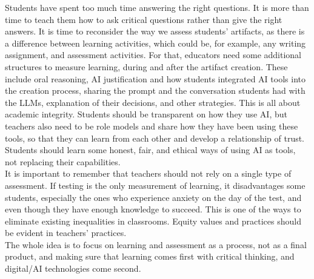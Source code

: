 \documentclass[english]{textolivre}
\begin{document}
{    Students have spent too much time answering the right questions. It is more than time to teach them how to ask critical questions rather than give the right answers. It is time to reconsider the way we assess students’ artifacts, as there is a difference between learning activities, which could be, for example, any writing assignment, and assessment activities. For that, educators need some additional structures to measure learning, during and after the artifact creation. These include oral reasoning, AI justification and how students integrated AI tools into the creation process, sharing the prompt and the conversation students had with the LLMs, explanation of their decisions, and other strategies. This is all about academic integrity. Students should be transparent on how they use AI, but teachers also need to be role models and share how they have been using these tools, so that they can learn from each other and develop a relationship of trust. Students should learn some honest, fair, and ethical ways of using AI as tools, not replacing their capabilities.\\
    It is important to remember that teachers should not rely on a single type of assessment. If testing is the only measurement of learning, it disadvantages some students, especially the ones who experience anxiety on the day of the test, and even though they have enough knowledge to succeed. This is one of the ways to eliminate existing inequalities in classrooms. Equity values and practices should be evident in teachers’ practices.\\
    The whole idea is to focus on learning and assessment as a process, not as a final product, and making sure that learning comes first with critical thinking, and digital/AI technologies come second.
}
    \begin{description}
        \interviewcontent
    \end{description}
\end{document}
